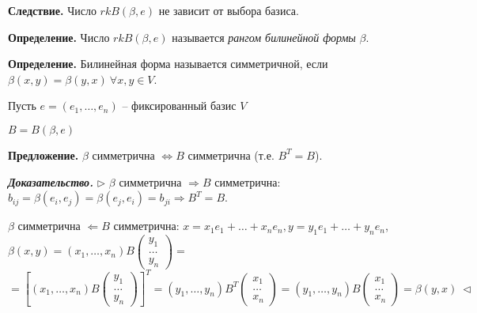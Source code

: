 \vspace{\baselineskip}
\textbf{Следствие.} Число $rkB(\beta, e)$ не зависит от выбора базиса.

\vspace{\baselineskip}
\textbf{Определение.} Число $rk B(\beta, e)$ называется \textit{рангом билинейной формы} $\beta$.

\vspace{\baselineskip}
\textbf{Определение.} Билинейная форма называется симметричной, если $\beta(x, y) = \beta(y, x) \ \forall x, y \in V$.

\vspace{\baselineskip}
Пусть $e = (e_1, \dots, e_n)$ -- фиксированный базис $V$

$B = B(\beta, e)$

\vspace{\baselineskip}
\textbf{Предложение.} $\beta$ симметрична $\Leftrightarrow B$ симметрична (т.е. $B^T = B$).

\vspace{\baselineskip}
\textbf{\textit{Доказательство.}} $\rhd$  $\beta$ симметрична $\Rightarrow B$ симметрична: $b_{ij} = \beta(e_i, e_j) = \beta(e_j, e_i) = b_{ji} \Rightarrow B^T = B$.

$\beta$ симметрична $\Leftarrow B$ симметрична: $x = x_1 e_1 + \dots + x_n e_n, y = y_1 e_1 + \dots + y_n e_n$, $\beta(x, y) = (x_1, \dots, x_n) B \begin{pmatrix} y_1 \\ \dots \\ y_n \end{pmatrix} =$ $= \left[ (x_1, \dots, x_n) B \begin{pmatrix} y_1 \\ \dots \\ y_n \end{pmatrix} \right]^T = (y_1, \dots, y_n) B^T \begin{pmatrix} x_1 \\ \dots \\ x_n \end{pmatrix} = (y_1, \dots, y_n) B \begin{pmatrix} x_1 \\ \dots \\ x_n \end{pmatrix} = \beta(y, x) \ \lhd $

